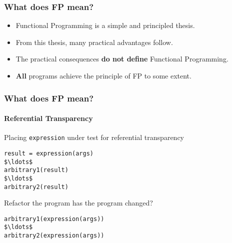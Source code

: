 \begin{frame}
\frametitle{What does FP mean?}
\begin{itemize}
  \item<1-> Functional Programming is a simple and principled thesis.
  \item<1-> From this thesis, many practical advantages follow.
  \item<2-> The practical consequences \textbf{do not define} Functional Programming.
  \item<3-> \textbf{All} programs achieve the principle of FP to some extent.
\end{itemize}
\end{frame}

\begin{frame}[fragile]
\frametitle{What does FP mean?}
\framesubtitle{Referential Transparency}
\begin{block}{Placing \lstinline{expression} under test for referential transparency}
\scriptsize
\begin{lstlisting}[mathescape]
result = expression(args)
$\ldots$
arbitrary1(result)
$\ldots$
arbitrary2(result)
\end{lstlisting}
\end{block}
\begin{block}{Refactor the program \textemdash has the program changed?}
\scriptsize
\begin{lstlisting}[mathescape]
arbitrary1(expression(args))
$\ldots$
arbitrary2(expression(args))
\end{lstlisting}
\end{block}
\end{frame}
